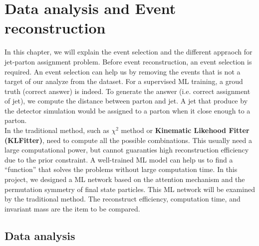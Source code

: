 \chapter{Data analysis and Event reconstruction}\label{section:Reconstruction}

In this chapter, we will explain the event selection and the different appraoch for jet-parton assignment problem. Before event reconstruction, an event selection is required. An event selection can help us by removing the events that is not a target of our analyze from the dataset. For a supervised ML training, a groud truth (correct answer) is indeed. To generate the answer (i.e. correct assignment of jet), we compute the distance between parton and jet. A jet that produce by the detector simulation would be assigned to a parton when it close enough to a parton. 
\\
In the traditional method, such as $\chi^{2}$ method or \textbf{Kinematic Likehood Fitter (KLFitter)}, need to compute all the possible combinations. This usually need a large computational power, but cannot guaranties high reconstruction efficiency due to the prior constraint. A well-trained ML model can help us to find a ``function'' that solves the problems without large computation time. In this project, we designed a ML network based on the attention mechanism and the permutation symmetry of final state particles. This ML network will be examined by the traditional method. The reconstruct efficiency, computation time, and invariant mass are the item to be compared. 
\\
\section{Data analysis}\label{sec:Data analysis}

